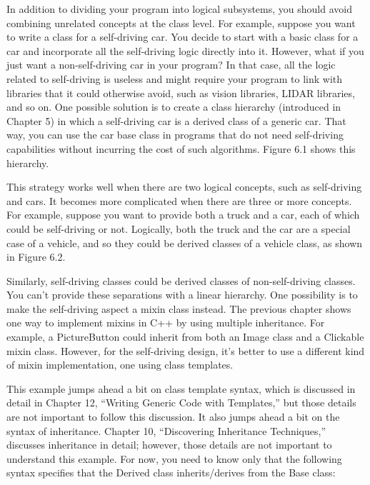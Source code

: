 
In addition to dividing your program into logical subsystems, you should avoid combining unrelated concepts at the class level. For example, suppose you want to write a class for a self-driving car. You decide to start with a basic class for a car and incorporate all the self-driving logic directly into it. However, what if you just want a non-self-driving car in your program? In that case, all the logic related to self-driving is useless and might require your program to link with libraries that it could otherwise avoid, such as vision libraries, LIDAR libraries, and so on. One possible solution is to create a class hierarchy (introduced in Chapter 5) in which a self-driving car is a derived class of a generic car. That way, you can use the car base class in programs that do not need self-driving capabilities without incurring the cost of such algorithms. Figure 6.1 shows this hierarchy.


This strategy works well when there are two logical concepts, such as self-driving and cars. It becomes more complicated when there are three or more concepts. For example, suppose you want to provide both a truck and a car, each of which could be self-driving or not. Logically, both the truck and the car are a special case of a vehicle, and so they could be derived classes of a vehicle class, as shown in Figure 6.2.


Similarly, self-driving classes could be derived classes of non-self-driving classes. You can’t provide these separations with a linear hierarchy. One possibility is to make the self-driving aspect a mixin class instead. The previous chapter shows one way to implement mixins in C++ by using multiple inheritance. For example, a PictureButton could inherit from both an Image class and a Clickable mixin class. However, for the self-driving design, it’s better to use a different kind of mixin implementation, one using class templates.

This example jumps ahead a bit on class template syntax, which is discussed in detail in Chapter 12, “Writing Generic Code with Templates,” but those details are not important to follow this discussion. It also jumps ahead a bit on the syntax of inheritance. Chapter 10, “Discovering Inheritance Techniques,” discusses inheritance in detail; however, those details are not important to understand this example. For now, you need to know only that the following syntax specifies that the Derived class inherits/derives from the Base class:

